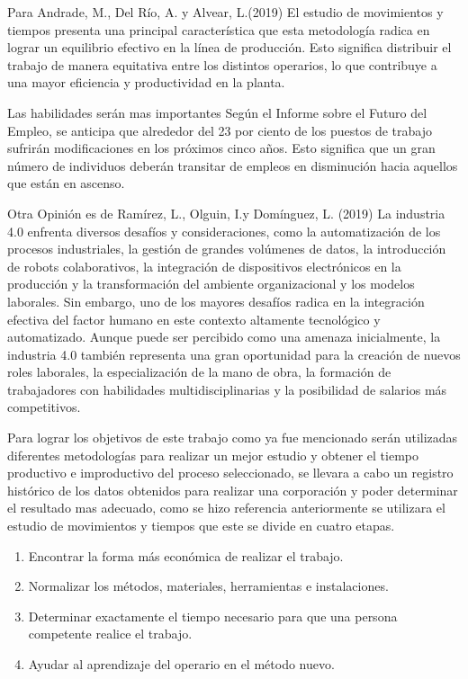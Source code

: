     Para Andrade, M., Del Río, A. y Alvear, L.(2019) El estudio de movimientos y tiempos presenta una principal característica que esta metodología radica en lograr un equilibrio efectivo en la línea de producción. Esto significa distribuir el trabajo de manera equitativa entre los distintos operarios, lo que contribuye a una mayor eficiencia y productividad en la planta.\cite{REF7}
    
    Las habilidades serán mas importantes Según el Informe sobre el Futuro del Empleo, se anticipa que alrededor del 23 por ciento de los puestos de trabajo sufrirán modificaciones en los próximos cinco años. Esto significa que un gran número de individuos deberán transitar de empleos en disminución hacia aquellos que están en ascenso.\cite{REF8}
    
    Otra Opinión es de Ramírez, L., Olguin, I.y Domínguez, L. (2019) La industria 4.0 enfrenta diversos desafíos y consideraciones, como la automatización de los procesos industriales, la gestión de grandes volúmenes de datos, la introducción de robots colaborativos, la integración de dispositivos electrónicos en la producción y la transformación del ambiente organizacional y los modelos laborales. Sin embargo, uno de los mayores desafíos radica en la integración efectiva del factor humano en este contexto altamente tecnológico y automatizado. Aunque puede ser percibido como una amenaza inicialmente, la industria 4.0 también representa una gran oportunidad para la creación de nuevos roles laborales, la especialización de la mano de obra, la formación de trabajadores con habilidades multidisciplinarias y la posibilidad de salarios más competitivos.\cite{REF9}
    
    Para lograr los objetivos de este trabajo como ya fue mencionado serán utilizadas diferentes metodologías para realizar un mejor estudio y obtener el tiempo productivo e improductivo del proceso seleccionado, se llevara a cabo un registro histórico de los datos obtenidos para realizar una corporación y poder determinar el resultado mas adecuado, como se hizo referencia anteriormente se utilizara el estudio de movimientos y tiempos que este se divide en cuatro etapas. 
    
    \begin{enumerate}
        \item Encontrar la forma más económica de realizar el trabajo.
        \item Normalizar los métodos, materiales, herramientas e instalaciones.
        \item Determinar exactamente el tiempo necesario para que una persona competente realice el trabajo.
        \item Ayudar al aprendizaje del operario en el método nuevo.
    \end{enumerate}
    
